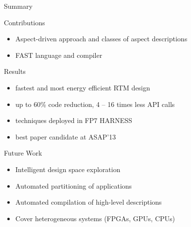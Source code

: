 \begin{frame}{Summary}
  \begin{beamerboxesrounded}{Contributions}
    \begin{itemize}
    \item  Aspect-driven approach and classes of aspect descriptions
    \item  FAST language and compiler
    \end{itemize}
  \end{beamerboxesrounded}
  \vspace{0.3cm}
  \begin{beamerboxesrounded}{Results}
    \begin{itemize}
    \item fastest and most energy efficient RTM design
    \item up to 60\% code reduction, 4 -- 16 times less API calls
    \item techniques deployed in FP7 HARNESS
    \item best paper candidate at ASAP'13
    \end{itemize}
  \end{beamerboxesrounded}
  \vspace{0.3cm}

  \begin{beamerboxesrounded}{Future Work}
    \begin{itemize}
    \item Intelligent design space exploration
    \item Automated partitioning of applications
    \item Automated compilation of high-level descriptions
    \item Cover heterogeneous systems (FPGAs, GPUs, CPUs)
    \end{itemize}
  \end{beamerboxesrounded}
\end{frame}
